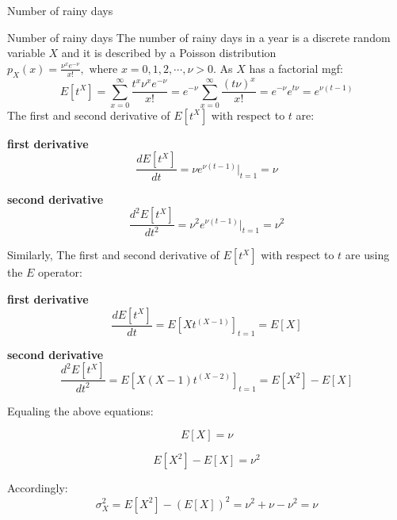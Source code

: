 \documentclass[8pt]{beamer}
\renewcommand{\emph}[1]{\textcolor{myorange}{#1}}
\begin{document}
\begin{frame}{Number of rainy days}
    \begin{exampleblock}{Number of rainy days}
        The number of rainy days in a year is a discrete random variable $X$ and it is described by a \emph{Poisson} distribution $p_X (x) =  \frac{\nu^x e^{-\nu}}{x!}, \text{ where } x = 0, 1, 2, \cdots, \nu > 0$. As $X$ has a factorial \emph{mgf}:
        \[
            E[t^X] = \sum_{x=0}^\infty \frac{t^x \nu^x e^{-\nu}}{x!} = e^{-\nu} \sum_{x=0}^\infty \frac{(t\nu)^x }{x!} = e^{-\nu} e^{t\nu} = e^{\nu(t-1)}
\]
The first and second derivative of $E[t^X]$ with respect to $t$ are:
\begin{minipage}[t]{0.47\textwidth}
\centering
\textbf{first derivative}
        \[
            \frac{d E[t^X]}{dt} = \nu e^{\nu(t-1)} \Big|_{t=1} = \nu
        \]
\end{minipage}
\begin{minipage}[t]{0.47\textwidth}
\centering
\textbf{second derivative}
        \[
            \frac{d^2 E[t^X]}{dt^2} = \nu^2 e^{\nu(t-1)} \Big|_{t=1} = \nu^2
        \]
\end{minipage}

Similarly, The first and second derivative of $E[t^X]$ with respect to $t$ are using the $E$ operator:

\begin{minipage}[t]{0.25\textwidth}
\centering
\textbf{first derivative}
        \[
            \frac{d E[t^X]}{dt} = E\left[X t^{(X-1)} \right]_{t=1} = E[X]
        \]
\end{minipage}
\hfill
\begin{minipage}[t]{0.55\textwidth}
\centering
\textbf{second derivative}
        \[
            \frac{d^2 E[t^X]}{dt^2} = E\left[X (X-1) t^{(X-2)} \right]_{t=1} = E[X^2] - E[X]
        \]
\end{minipage}

Equaling the above equations:

\begin{minipage}[t]{0.44\textwidth}
        \[
            E[X] = \nu 
        \]
\end{minipage}
\begin{minipage}[t]{0.44\textwidth}
        \[
            E[X^2] - E[X] = \nu^2
        \]
\end{minipage}

Accordingly:
\[
    \sigma_X^2 = E[X^2] - \left( E[X] \right)^2 = \nu^2 + \nu - \nu^2 = \nu
        \]

    \end{exampleblock}
\end{frame}
\end{document}
